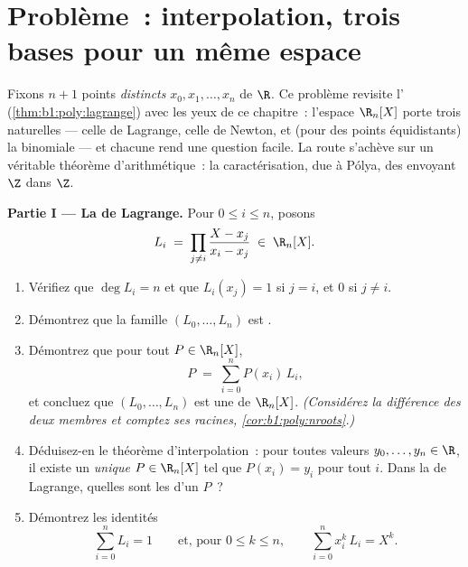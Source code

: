 \section{Problème~: interpolation, trois bases pour un même espace}

\begin{problem}\label{pb:b1:vspaces:1}
Fixons $n + 1$ points \emph{distincts} $x_0, x_1, \dots, x_n$ de $\R$.
Ce problème revisite l'
(\cref{thm:b1:poly:lagrange}) avec les yeux de ce chapitre~: l'espace
$\R_n[X]$ porte trois  naturelles --- celle de Lagrange, celle de
Newton, et (pour des points équidistants) la  binomiale ---
et chacune rend une question facile. La route s'achève sur un
véritable théorème d'arithmétique~: la caractérisation, due à Pólya,
des  envoyant $\Z$ dans $\Z$.

\medskip
\noindent\textbf{Partie I --- La  de Lagrange.} Pour $0 \leq i
\leq n$, posons
\[
L_i \;=\; \prod_{j \neq i} \frac{X - x_j}{x_i - x_j} \;\in\;
\R_n[X].
\]
\begin{enumerate}
  \item Vérifiez que $\deg L_i = n$ et que $L_i(x_j) = 1$ si $j =
        i$, et $0$ si $j \neq i$.
  \item Démontrez que la famille $(L_0, \dots, L_n)$ est .
  \item Démontrez que pour tout $P \in \R_n[X]$,
        \[
        P \;=\; \sum_{i=0}^{n} P(x_i)\, L_i ,
        \]
        et concluez que $(L_0, \dots, L_n)$ est une  de
        $\R_n[X]$. \emph{(Considérez la différence des deux membres
        et comptez ses racines, \cref{cor:b1:poly:nroots}.)}
  \item Déduisez-en le théorème d'interpolation~: pour toutes valeurs
        $y_0, \dots, y_n \in \R$, il existe un \emph{unique} $P \in
        \R_n[X]$ tel que $P(x_i) = y_i$ pour tout $i$. Dans la 
        de Lagrange, quelles sont les  d'un  $P$~?
  \item Démontrez les identités
        \[
        \sum_{i=0}^{n} L_i = 1
        \qquad\text{et, pour } 0 \leq k \leq n,\qquad
        \sum_{i=0}^{n} x_i^{k}\, L_i = X^{k} .
        \]
\end{enumerate}


\end{problem}
